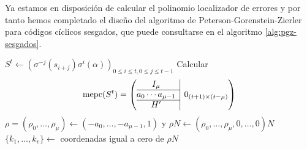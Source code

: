 Ya estamos en disposición de calcular el polinomio localizador de errores y por tanto hemos completado el diseño del algoritmo de Peterson-Gorenstein-Zierler para códigos cíclicos sesgados, que puede consultarse en el algoritmo \ref{alg:pgz-sesgados}.

\begin{Ualgorithm}[htbp]
  \small
  \DontPrintSemicolon
  \(S^t \longleftarrow \left(\sigma^{-j}(s_{i+j})\sigma^i(\alpha)\right)_{0 \leq i \leq t, 0 \leq j \leq t -1}\)\;
  Calcular
  \[
    \operatorname{mepc}(S^t) = \left( \begin{array}{@{}c|c@{}}
      I_{\mu} & \multirow{3}{*}{\(0_{(t+ 1)\times (t - \mu)}\)} \\\cline{1-1}
      a_0 \cdots a_{\mu -1 } & \\\cline{1-1}
      H' &
    \end{array}\right)
  \]\vspace*{-1.5em}\;%
  \(\rho = (\rho_0, \dots, \rho_{\mu}) \longleftarrow (-a_0, \dots, -a_{\mu-1}, 1)\) y \(\rho N \longleftarrow (\rho_0, \dots, \rho_{\mu}, 0, \dots, 0)N\)\;\label{algl:pgz-sesgados-rho}
  \(\{k_1, \dots, k_v\} \longleftarrow \) coordenadas igual a cero de \(\rho N\)\;\label{algl:pgz-sesgados-pos-error}
\end{Ualgorithm}
